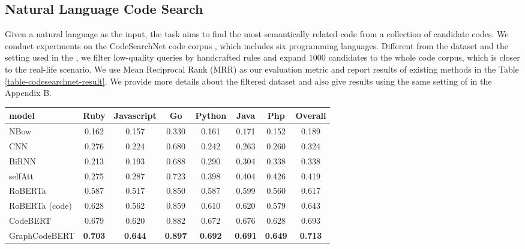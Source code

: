 \documentclass{article} \usepackage{iclr2021_conference,times}
\begin{document}
\subsection{Natural Language Code Search}\label{section:experiment-code-search}
Given a natural language as the input, the task aims to find the most semantically related code from a collection of candidate codes.
We conduct experiments on the CodeSearchNet code corpus \citep{husain2019codesearchnet}, which includes six programming languages.
Different from the dataset and the setting used in the \citet{husain2019codesearchnet}, we filter low-quality queries by handcrafted rules and expand 1000 candidates to the whole code corpus, which is closer to the real-life scenario. 
We use Mean Reciprocal Rank (MRR) as our evaluation metric and report results of existing methods in the Table \ref{table-codesearchnet-result}. We provide more details about the filtered dataset and also give results using the same setting of \citet{husain2019codesearchnet}  in the Appendix B.


\begin{table*}[h]
	\begin{center}
		\begin{small}
				\begin{tabular}{lccccccc}
					\toprule
model & Ruby & Javascript & Go & Python & Java & Php & Overall\\
					\midrule
NBow &0.162 & 0.157 & 0.330& 0.161 & 0.171 & 0.152 & 0.189\\
					CNN & 0.276 & 0.224 & 0.680 &  0.242 & 0.263 & 0.260 & 0.324\\	
					BiRNN  & 0.213& 0.193 & 0.688& 0.290 & 0.304 & 0.338 & 0.338\\
					selfAtt  & 0.275& 0.287 & 0.723& 0.398 & 0.404 & 0.426 & 0.419\\
					\hline
					RoBERTa  & 0.587& 0.517 & 0.850&   0.587 & 0.599& 0.560 &0.617 \\
					RoBERTa (code)   & 0.628& 0.562 &0.859 & 0.610 & 0.620 & 0.579 &0.643\\
					CodeBERT  & 0.679& 0.620 & 0.882& 0.672 & 0.676 & 0.628 & 0.693\\
					GraphCodeBERT   & \bf{0.703}& \bf{0.644} & \bf{0.897}& \bf{0.692} & \bf{0.691} & \bf{0.649} & \bf{0.713}\\
					\bottomrule
				\end{tabular}
    \caption{Results on code search. GraphCodeBERT outperforms other models significantly (). }
    	\label{table-codesearchnet-result}
		\end{small}
	\end{center}
\end{table*}
\end{document}
